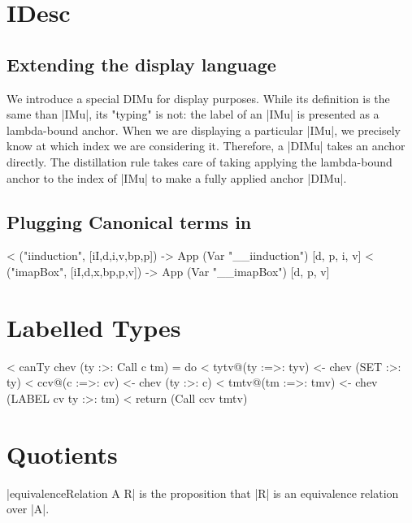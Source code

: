 \section{IDesc}

\subsection{Extending the display language}

We introduce a special DIMu for display purposes. While its definition
is the same than |IMu|, its "typing" is not: the label of an |IMu| is
presented as a lambda-bound anchor. When we are displaying a
particular |IMu|, we precisely know at which index we are considering
it. Therefore, a |DIMu| takes an anchor directly. The distillation
rule takes care of taking applying the lambda-bound anchor to the
index of |IMu| to make a fully applied anchor |DIMu|.

\subsection{Plugging Canonical terms in}

<  ("iinduction", [iI,d,i,v,bp,p]) -> App (Var "__iinduction") [d, p, i, v]
<  ("imapBox", [iI,d,x,bp,p,v]) -> App (Var "__imapBox") [d, p, v]

\section{Labelled Types}


<   canTy chev (ty :>: Call c tm) = do
<      tytv@(ty :=>: tyv) <- chev (SET :>: ty)
<      ccv@(c :=>: cv) <- chev (ty :>: c)
<      tmtv@(tm :=>: tmv) <- chev (LABEL cv ty :>: tm)
<      return (Call ccv tmtv)

\section{Quotients}

|equivalenceRelation A R| is the proposition that |R| is an equivalence
relation over |A|.
